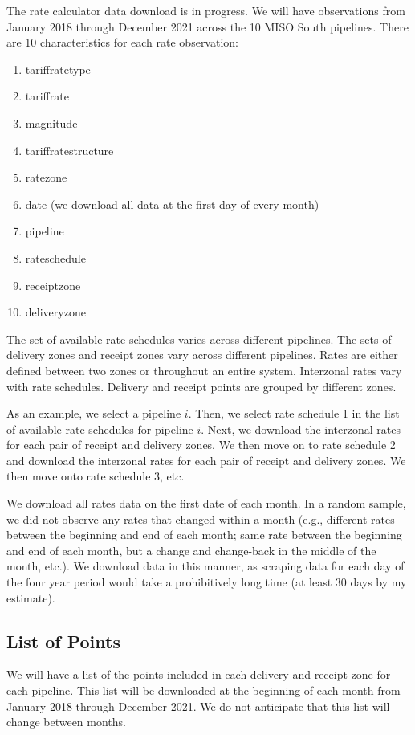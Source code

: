 \documentclass{article}
\newcommand{\1}{\mathbbm{1}}
\newcommand{\us}{\textunderscore}
\theoremstyle{definition}
\begin{document}
The rate calculator data download is in progress. We will have observations from January 2018 through December 2021 across the 10 MISO South pipelines. There are 10 characteristics for each rate observation:
\begin{enumerate}
    \item tariff\us rate\us type
    \item tariff\us rate
    \item magnitude
    \item tariff\us rate\us structure
    \item rate\us zone
    \item date (we download all data at the first day of every month)
    \item pipeline
    \item rate\us schedule
    \item receipt\us zone
    \item delivery\us zone
\end{enumerate}
The set of available rate schedules varies across different pipelines. The sets of delivery zones and receipt zones vary across different pipelines. Rates are either defined between two zones or throughout an entire system. Interzonal rates vary with rate schedules. Delivery and receipt points are grouped by different zones. 

As an example, we select a pipeline $i$. Then, we select rate schedule 1 in the list of available rate schedules for pipeline $i$. Next, we download the interzonal rates for each pair of receipt and delivery zones. We then move on to rate schedule 2 and download the interzonal rates for each pair of receipt and delivery zones. We then move onto rate schedule 3, etc. 

We download all rates data on the first date of each month. In a random sample, we did not observe any rates that changed within a month (e.g., different rates between the beginning and end of each month; same rate between the beginning and end of each month, but a change and change-back in the middle of the month, etc.). We download data in this manner, as scraping data for each day of the four year period would take a prohibitively long time (at least 30 days by my estimate).

\subsection{List of Points}
We will have a list of the points included in each delivery and receipt zone for each pipeline. This list will be downloaded at the beginning of each month from January 2018 through December 2021. We do not anticipate that this list will change between months. 
\end{document}
